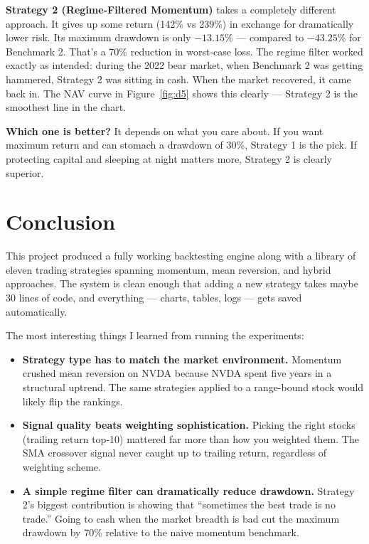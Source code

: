 \documentclass[11pt,a4paper]{article}
\begin{document}
\textbf{Strategy 2 (Regime-Filtered Momentum)} takes a completely different approach.
It gives up some return (142\% vs 239\%) in exchange for dramatically lower risk.
Its maximum drawdown is only $-13.15\%$ --- compared to $-43.25\%$ for Benchmark 2.
That's a 70\% reduction in worst-case loss.
The regime filter worked exactly as intended: during the 2022 bear market, when
Benchmark 2 was getting hammered, Strategy 2 was sitting in cash.
When the market recovered, it came back in. The NAV curve in Figure~\ref{fig:d5}
shows this clearly --- Strategy 2 is the smoothest line in the chart.

\textbf{Which one is better?}
It depends on what you care about.
If you want maximum return and can stomach a drawdown of 30\%, Strategy 1 is the pick.
If protecting capital and sleeping at night matters more, Strategy 2 is clearly superior.

\section{Conclusion}

This project produced a fully working backtesting engine along with a library of
eleven trading strategies spanning momentum, mean reversion, and hybrid approaches.
The system is clean enough that adding a new strategy takes maybe 30 lines of code,
and everything --- charts, tables, logs --- gets saved automatically.

The most interesting things I learned from running the experiments:

\begin{itemize}[leftmargin=*]
    \item \textbf{Strategy type has to match the market environment.}
          Momentum crushed mean reversion on NVDA because NVDA spent five years
          in a structural uptrend. The same strategies applied to a range-bound
          stock would likely flip the rankings.

    \item \textbf{Signal quality beats weighting sophistication.}
          Picking the right stocks (trailing return top-10) mattered far more than
          how you weighted them. The SMA crossover signal never caught up to
          trailing return, regardless of weighting scheme.

    \item \textbf{A simple regime filter can dramatically reduce drawdown.}
          Strategy 2's biggest contribution is showing that ``sometimes the best
          trade is no trade.'' Going to cash when the market breadth is bad
          cut the maximum drawdown by 70\% relative to the naive momentum benchmark.

\end{itemize}
\end{document}
